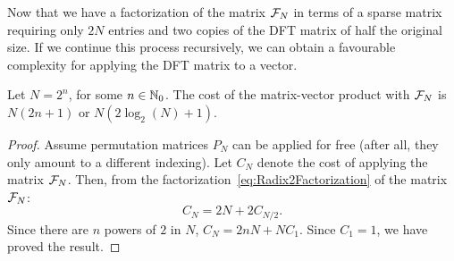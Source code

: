 Now that we have a factorization of the matrix $\mathcal{F}_N$ in terms of a sparse matrix requiring only $2N$ entries and two copies of the DFT matrix of half the original size. If we continue this process recursively, we can obtain a favourable complexity for applying the DFT matrix to a vector.
\begin{theorem}
Let $N=2^n$, for some $n\in\mathbb{N}_0$. The cost of the matrix-vector product with $\mathcal{F}_N$ is $N(2n+1)$ or $N(2\log_2(N)+1)$.
\end{theorem}
\begin{proof}
Assume permutation matrices $P_N$ can be applied for free (after all, they only amount to a different indexing). Let $C_N$ denote the cost of applying the matrix $\mathcal{F}_N$. Then, from the factorization~\eqref{eq:Radix2Factorization} of the matrix $\mathcal{F}_N$:
\[
C_N = 2N + 2C_{N/2}.
\]
Since there are $n$ powers of $2$ in $N$, $C_N = 2nN+NC_1$. Since $C_1=1$, we have proved the result.
\end{proof}

